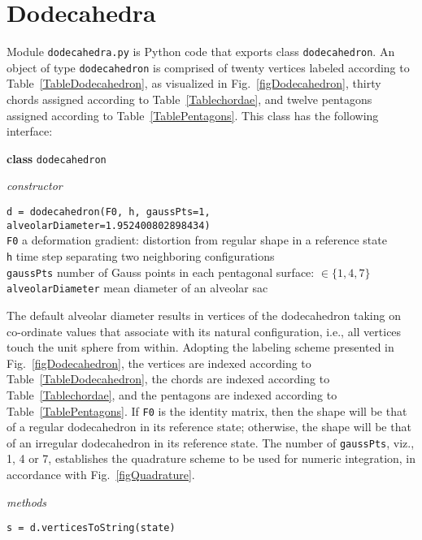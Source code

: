 \section{Dodecahedra}
\label{appDodecahedra}

Module \texttt{dodecahedra.py} is Python code that exports class \texttt{dodecahedron}.  An object of type \texttt{dodecahedron} is comprised of twenty vertices labeled according to Table~\ref{TableDodecahedron}, as visualized in Fig.~\ref{figDodecahedron}, thirty chords assigned according to Table~\ref{Tablechordae}, and twelve pentagons assigned according to Table~\ref{TablePentagons}.  This class has the following interface:

\noindent
\textbf{class} \texttt{dodecahedron}

\medskip\noindent
\textit{constructor}

\medskip\noindent
\texttt{d = dodecahedron(F0, h, gaussPts=1, alveolarDiameter=1.952400802898434)} \\
\indent \texttt{F0} \qquad\qquad a deformation gradient: distortion from regular shape in a reference state \\
\indent \texttt{h} \qquad\qquad\; time step separating two neighboring configurations \\
\indent \texttt{gaussPts} \quad number of Gauss points in each pentagonal surface: $\in \{ 1 , 4, 7 \}$ \\
\indent \texttt{alveolarDiameter} \; mean diameter of an alveolar sac

\medskip\noindent
The default alveolar diameter results in vertices of the dodecahedron taking on co-ordinate values that associate with its natural configuration, i.e., all vertices touch the unit sphere from within.  Adopting the labeling scheme presented in Fig.~\ref{figDodecahedron}, the vertices are indexed according to Table~\ref{TableDodecahedron}, the chords are indexed according to Table~\ref{Tablechordae}, and the pentagons are indexed according to Table~\ref{TablePentagons}.  If \texttt{F0} is the identity matrix, then the shape will be that of a regular dodecahedron in its reference state; otherwise, the shape will be that of an irregular dodecahedron in its reference state.  The number of \texttt{gaussPts}, viz., 1, 4 or 7, establishes the quadrature scheme to be used for numeric integration, in accordance with Fig.~\ref{figQuadrature}.

\medskip\noindent
\textit{methods}

\medskip\noindent
\texttt{s = d.verticesToString(state)}

